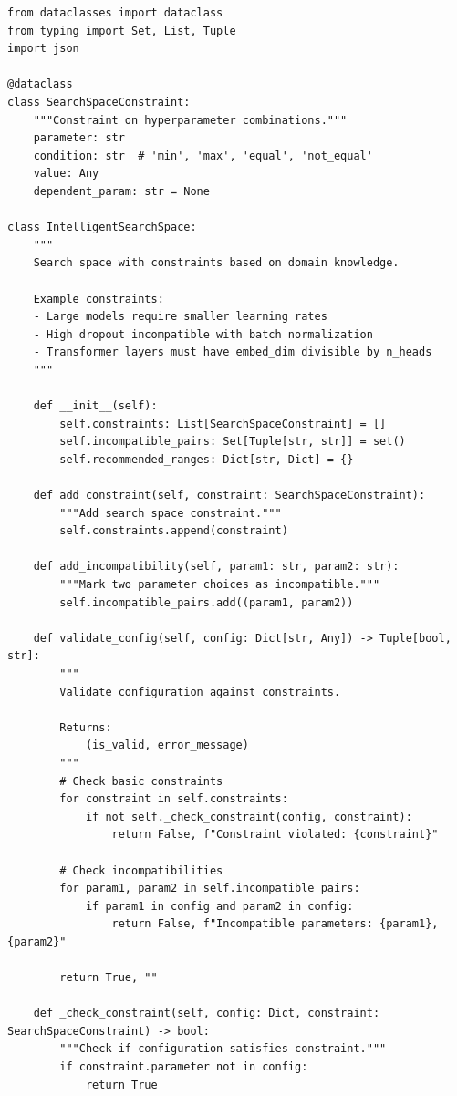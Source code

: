 \begin{lstlisting}[style=python, caption=Intelligent search space pruning]
from dataclasses import dataclass
from typing import Set, List, Tuple
import json

@dataclass
class SearchSpaceConstraint:
    """Constraint on hyperparameter combinations."""
    parameter: str
    condition: str  # 'min', 'max', 'equal', 'not_equal'
    value: Any
    dependent_param: str = None

class IntelligentSearchSpace:
    """
    Search space with constraints based on domain knowledge.

    Example constraints:
    - Large models require smaller learning rates
    - High dropout incompatible with batch normalization
    - Transformer layers must have embed_dim divisible by n_heads
    """

    def __init__(self):
        self.constraints: List[SearchSpaceConstraint] = []
        self.incompatible_pairs: Set[Tuple[str, str]] = set()
        self.recommended_ranges: Dict[str, Dict] = {}

    def add_constraint(self, constraint: SearchSpaceConstraint):
        """Add search space constraint."""
        self.constraints.append(constraint)

    def add_incompatibility(self, param1: str, param2: str):
        """Mark two parameter choices as incompatible."""
        self.incompatible_pairs.add((param1, param2))

    def validate_config(self, config: Dict[str, Any]) -> Tuple[bool, str]:
        """
        Validate configuration against constraints.

        Returns:
            (is_valid, error_message)
        """
        # Check basic constraints
        for constraint in self.constraints:
            if not self._check_constraint(config, constraint):
                return False, f"Constraint violated: {constraint}"

        # Check incompatibilities
        for param1, param2 in self.incompatible_pairs:
            if param1 in config and param2 in config:
                return False, f"Incompatible parameters: {param1}, {param2}"

        return True, ""

    def _check_constraint(self, config: Dict, constraint: SearchSpaceConstraint) -> bool:
        """Check if configuration satisfies constraint."""
        if constraint.parameter not in config:
            return True


\end{lstlisting}
